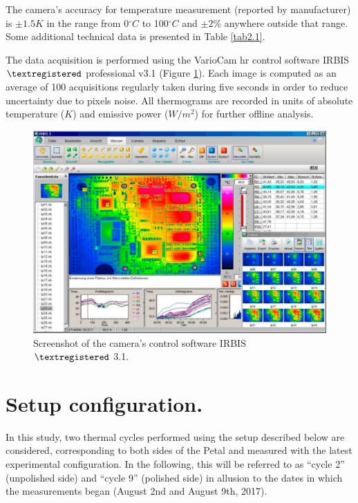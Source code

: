 		The camera’s accuracy for temperature measurement (reported by manufacturer) is $\pm 1.5 K$ in the range from 0\space$^\circ C$ to 100\space$^\circ C$ and $\pm2$\% anywhere outside that range. Some additional technical data is presented in Table \ref{tab2.1}.
		
		The data acquisition is performed using the VarioCam hr control software IRBIS $\textregistered$ professional v3.1 (Figure \ref{fig2.6}). Each image is computed as an average of 100 acquisitions regularly taken during five seconds in order to reduce uncertainty due to pixels noise. All thermograms are recorded in units of absolute temperature ($K$) and emissive power ($W/m^2$) for further offline analysis.
		
		\begin{figure}[ht!]
			\centering
			\captionsetup{justification=centering,margin=2cm}
			\includegraphics[scale=0.25]{Figures/Chapter02/IRBISimage.pdf}
			\caption{Screenshot of the camera’s control software IRBIS $\textregistered$ 3.1.}\label{fig2.6}
		\end{figure}\bigskip
		
	\section{Setup configuration.}\label{section2.4}
	
		In this study, two thermal cycles performed using the setup described below are considered, corresponding to both sides of the Petal and measured with the latest experimental configuration. In the following, this will be referred to as “cycle 2” (unpolished side) and “cycle 9” (polished side) in allusion to the dates in which the measurements began (August 2nd and August 9th, 2017). 
		
